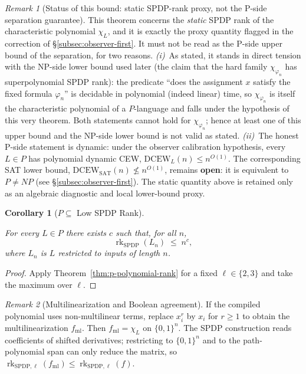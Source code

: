 \documentclass[12pt]{article}
\newtheorem{corollary}[theorem]{Corollary}
\theoremstyle{definition}
\theoremstyle{definition}
\theoremstyle{remark}
\newtheorem{remark}{Remark}
\theoremstyle{remark}
\begin{document}
\begin{remark}[Status of this bound: static SPDP-rank proxy, not the P-side separation guarantee]
This theorem concerns the \emph{static} SPDP rank of the characteristic polynomial $\chi_L$, and it is exactly the proxy quantity flagged in the correction of \S\ref{subsec:observer-first}.  It must not be read as the P-side upper bound of the separation, for two reasons.  \emph{(i)}~As stated, it stands in direct tension with the NP-side lower bound used later (the claim that the hard family $\chi_{\varphi_n}$ has superpolynomial SPDP rank): the predicate ``does the assignment $x$ satisfy the fixed formula $\varphi_n$'' is decidable in polynomial (indeed linear) time, so $\chi_{\varphi_n}$ is itself the characteristic polynomial of a $P$-language and falls under the hypothesis of this very theorem.  Both statements cannot hold for $\chi_{\varphi_n}$; hence at least one of this upper bound and the NP-side lower bound is not valid as stated.  \emph{(ii)}~The honest P-side statement is dynamic: under the observer calibration hypothesis, every $L\in P$ has polynomial dynamic CEW, $\mathrm{DCEW}_L(n)\le n^{O(1)}$.  The corresponding SAT lower bound, $\mathrm{DCEW}_{\mathrm{SAT}}(n)\not\le n^{O(1)}$, remains \textbf{open}: it is equivalent to $P\neq NP$ (see \S\ref{subsec:observer-first}).  The static quantity above is retained only as an algebraic diagnostic and local lower-bound proxy.
\end{remark}

\begin{corollary}[$P \subseteq$ Low SPDP Rank]\label{thm:p-characterization}\label{thm:poly-rank-constructive}

For every $L \in P$ there exists $c$ such that, for all $n$,
\[
\operatorname{rk}_{\mathrm{SPDP}}(L_n) \;\le\; n^c,
\]
where $L_n$ is $L$ restricted to inputs of length $n$.
\end{corollary}

\begin{proof}
Apply Theorem~\ref{thm:p-polynomial-rank} for a fixed $\ell \in \{2,3\}$ and take the maximum over $\ell$.
\end{proof}

\begin{remark}[Multilinearization and Boolean agreement]
If the compiled polynomial uses non-multilinear terms, replace $x_i^r$ by $x_i$ for $r \geq 1$ to obtain the multilinearization $f_{\mathrm{ml}}$. Then $f_{\mathrm{ml}} = \chi_L$ on $\{0,1\}^n$. The SPDP construction reads coefficients of shifted derivatives; restricting to $\{0,1\}^n$ and to the path-polynomial span can only reduce the matrix, so $\operatorname{rk}_{\mathrm{SPDP},\ell}(f_{\mathrm{ml}}) \le \operatorname{rk}_{\mathrm{SPDP},\ell}(f)$.
\end{remark}
\end{document}
